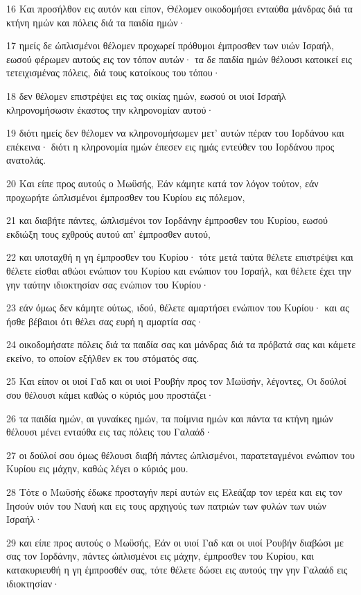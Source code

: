 \par 16 Και προσήλθον εις αυτόν και είπον, Θέλομεν οικοδομήσει ενταύθα μάνδρας διά τα κτήνη ημών και πόλεις διά τα παιδία ημών·
\par 17 ημείς δε ώπλισμένοι θέλομεν προχωρεί πρόθυμοι έμπροσθεν των υιών Ισραήλ, εωσού φέρωμεν αυτούς εις τον τόπον αυτών· τα δε παιδία ημών θέλουσι κατοικεί εις τετειχισμένας πόλεις, διά τους κατοίκους του τόπου·
\par 18 δεν θέλομεν επιστρέψει εις τας οικίας ημών, εωσού οι υιοί Ισραήλ κληρονομήσωσιν έκαστος την κληρονομίαν αυτού·
\par 19 διότι ημείς δεν θέλομεν να κληρονομήσωμεν μετ' αυτών πέραν του Ιορδάνου και επέκεινα· διότι η κληρονομία ημών έπεσεν εις ημάς εντεύθεν του Ιορδάνου προς ανατολάς.
\par 20 Και είπε προς αυτούς ο Μωϋσής, Εάν κάμητε κατά τον λόγον τούτον, εάν προχωρήτε ώπλισμένοι έμπροσθεν του Κυρίου εις πόλεμον,
\par 21 και διαβήτε πάντες, ώπλισμένοι τον Ιορδάνην έμπροσθεν του Κυρίου, εωσού εκδιώξη τους εχθρούς αυτού απ' έμπροσθεν αυτού,
\par 22 και υποταχθή η γη έμπροσθεν του Κυρίου· τότε μετά ταύτα θέλετε επιστρέψει και θέλετε είσθαι αθώοι ενώπιον του Κυρίου και ενώπιον του Ισραήλ, και θέλετε έχει την γην ταύτην ιδιοκτησίαν σας ενώπιον του Κυρίου·
\par 23 εάν όμως δεν κάμητε ούτως, ιδού, θέλετε αμαρτήσει ενώπιον του Κυρίου· και ας ήσθε βέβαιοι ότι θέλει σας ευρή η αμαρτία σας·
\par 24 οικοδομήσατε πόλεις διά τα παιδία σας και μάνδρας διά τα πρόβατά σας και κάμετε εκείνο, το οποίον εξήλθεν εκ του στόματός σας.
\par 25 Και είπον οι υιοί Γαδ και οι υιοί Ρουβήν προς τον Μωϋσήν, λέγοντες, Οι δούλοί σου θέλουσι κάμει καθώς ο κύριός μου προστάζει·
\par 26 τα παιδία ημών, αι γυναίκες ημών, τα ποίμνια ημών και πάντα τα κτήνη ημών θέλουσι μένει ενταύθα εις τας πόλεις του Γαλαάδ·
\par 27 οι δούλοί σου όμως θέλουσι διαβή πάντες ώπλισμένοι, παρατεταγμένοι ενώπιον του Κυρίου εις μάχην, καθώς λέγει ο κύριός μου.
\par 28 Τότε ο Μωϋσής έδωκε προσταγήν περί αυτών εις Ελεάζαρ τον ιερέα και εις τον Ιησούν υιόν του Ναυή και εις τους αρχηγούς των πατριών των φυλών των υιών Ισραήλ·
\par 29 και είπε προς αυτούς ο Μωϋσής, Εάν οι υιοί Γαδ και οι υιοί Ρουβήν διαβώσι με σας τον Ιορδάνην, πάντες ώπλισμένοι εις μάχην, έμπροσθεν του Κυρίου, και κατακυριευθή η γη έμπροσθέν σας, τότε θέλετε δώσει εις αυτούς την γην Γαλαάδ εις ιδιοκτησίαν·
